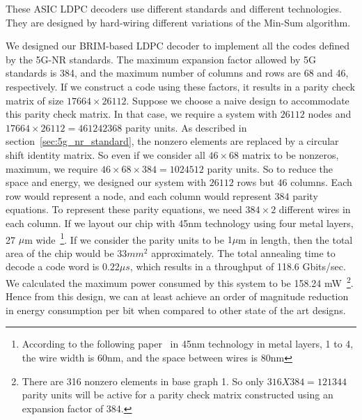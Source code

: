 These ASIC LDPC decoders use different standards and different technologies. They are designed by hard-wiring different variations of the Min-Sum algorithm. 

We designed our BRIM-based LDPC decoder to implement all the codes defined by the 5G-NR standards. The maximum expansion factor allowed by 5G standards is 384, and the maximum number of columns and rows are 68 and 46, respectively. If we construct a code using these factors, it results in a parity check matrix of size $17664 \times 26112$. Suppose we choose a naive design to accommodate this parity check matrix. In that case, we require a system with $26112$ nodes and $17664 \times 26112 = 461242368$ parity units. As described in section~\ref{sec:5g_nr_standard}, the nonzero elements are replaced by a circular shift identity matrix. So even if we consider all $46 \times 68$ matrix to be nonzeros, maximum, we require $46 \times 68\times 384=1024512$ parity units. So to reduce the space and energy, we designed our system with $26112$ rows but $46$ columns. Each row would represent a node, and each column would represent $384$ parity equations. To represent these parity equations, we need $384\times 2$ different wires in each column. If we layout our chip with 45nm technology using four metal layers, 27 $\mu$m wide~\footnote{According to the following paper~\cite{sicard2011introducing} in 45nm technology in metal layers, 1 to 4, the wire width is 60nm, and the space between wires is 80nm}.
If we consider the parity units to be $1\mu$m in length, then the total area of the chip would be 33$mm^2$ approximately. The total annealing time to decode a code word is $0.22 \mu s$, which results in a throughput of 118.6 Gbits/sec. We calculated the maximum power consumed by this system to be 158.24 mW~\footnote{There are 316 nonzero elements in base graph 1. So only $316X384 = 121344$ parity units will be active for a parity check matrix constructed using an expansion factor of 384.}. Hence from this design, we can at least achieve an order of magnitude reduction in energy consumption per bit when compared to other state of the art designs.


